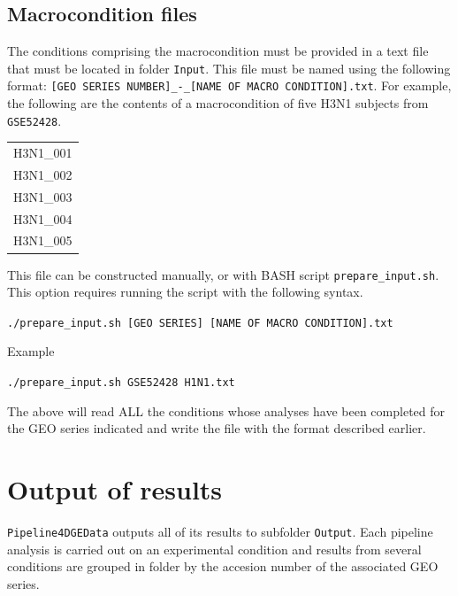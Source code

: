 \documentclass[final,letterpaper,12pt]{article}
\begin{document}
\subsection{Macrocondition files}
\label{subsection:macrocondition}

\par The conditions comprising the macrocondition must be provided in a text file that must be located in folder \texttt{Input}. This file must be named using the following format: \texttt{[GEO SERIES NUMBER]\_-\_[NAME OF MACRO CONDITION].txt}. For example, the following are the contents of a macrocondition of five H3N1 subjects from \texttt{GSE52428}.

\begin{center}
\begin{tabular}{ c }

H3N1\_001 \\
H3N1\_002 \\
H3N1\_003 \\
H3N1\_004 \\
H3N1\_005 \\

\end{tabular}
\end{center}


\par This file can be constructed manually, or with BASH script \texttt{prepare\_input.sh}. This option requires running the script with the following syntax.

\texttt{./prepare\_input.sh [GEO SERIES] [NAME OF MACRO CONDITION].txt}

\par Example

\texttt{./prepare\_input.sh GSE52428 H1N1.txt}

\par The above will read ALL the conditions whose analyses have been completed for the GEO series indicated and write the file with the format described earlier.

\section{Output of results}
\label{section:pipelineoutput}

\par \texttt{Pipeline4DGEData} outputs all of its results to subfolder \texttt{Output}. Each pipeline analysis is carried out on an experimental condition and results from several conditions are grouped in folder by the accesion number of the associated GEO series.
\end{document}
